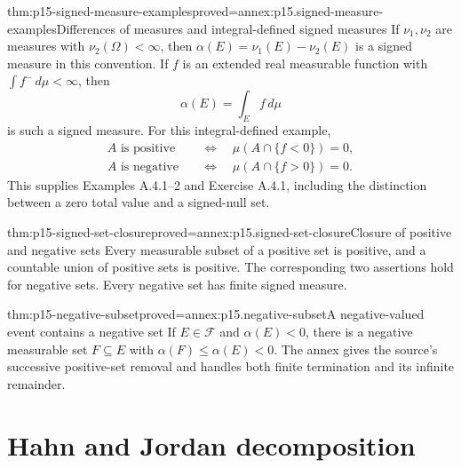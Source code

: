 \begin{hbtheorem}{thm:p15-signed-measure-examples}{proved=annex:p15.signed-measure-examples}{Differences of measures and integral-defined signed measures}
If \(\nu_1,\nu_2\) are measures with \(\nu_2(\Omega)<\infty\), then
\(\alpha(E)=\nu_1(E)-\nu_2(E)\) is a signed measure in this convention.
If \(f\) is an extended real measurable function with
\(\int f^-\,d\mu<\infty\), then
\[
                            \alpha(E)=\int_E f\,d\mu
\]
is such a signed measure. For this integral-defined example,
\[
 \begin{aligned}
 A\text{ is positive}&\quad\Longleftrightarrow\quad
                           \mu(A\cap\{f<0\})=0,\\
 A\text{ is negative}&\quad\Longleftrightarrow\quad
                           \mu(A\cap\{f>0\})=0.
 \end{aligned}
\]
This supplies Examples A.4.1--2 and Exercise A.4.1, including the
distinction between a zero total value and a signed-null set.
\end{hbtheorem}

\begin{hblemma}{thm:p15-signed-set-closure}{proved=annex:p15.signed-set-closure}{Closure of positive and negative sets}
Every measurable subset of a positive set is positive, and a countable
union of positive sets is positive. The corresponding two assertions
hold for negative sets. Every negative set has finite signed measure.
\end{hblemma}

\begin{hblemma}{thm:p15-negative-subset}{proved=annex:p15.negative-subset}{A negative-valued event contains a negative set}
If \(E\in\mathcal F\) and \(\alpha(E)<0\), there is a negative measurable
set \(F\subseteq E\) with \(\alpha(F)\leq\alpha(E)<0\).
The annex gives the source's successive positive-set removal and handles
both finite termination and its infinite remainder.
\end{hblemma}

\section{Hahn and Jordan decomposition}
\label{sec:p15-hahn-jordan}


